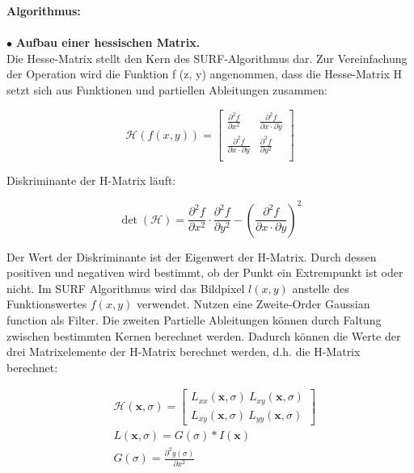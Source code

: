 \textbf{Algorithmus:}\\
\\
$\bullet$ \textbf{Aufbau einer hessischen Matrix.}\\
Die Hesse-Matrix stellt den Kern des SURF-Algorithmus dar. Zur Vereinfachung der Operation wird die Funktion f (z, y) angenommen, dass die Hesse-Matrix H setzt sich aus Funktionen und partiellen Ableitungen zusammen:

\begin{equation}
   \mathcal{H}(f(x,y)) = \begin{bmatrix}
   \frac{\partial^{2}f}{\partial x^{2}} & \frac{\partial^{2}f}{\partial x \cdot \partial y} \\
   \frac{\partial^{2}f}{\partial x \cdot \partial y} & \frac{\partial^{2}f}{\partial y^{2}} \\   
   \end{bmatrix}
\end{equation}

 Diskriminante der H-Matrix läuft:
 
\begin{equation}
   \det(\mathcal{H}) = \frac{\partial^{2}f}{\partial x^{2}} \cdot \frac{\partial^{2}f}{\partial y^{2}} - (\frac{\partial^{2}f}{\partial x \cdot \partial y})^2  
\end{equation}

Der Wert der Diskriminante ist der Eigenwert der H-Matrix. Durch dessen positiven und negativen wird bestimmt, ob der Punkt ein Extrempunkt ist oder nicht. Im SURF Algorithmus wird das Bildpixel $l(x,y)$ anstelle des Funktionswertes $f(x,y)$ verwendet. Nutzen eine Zweite-Order Gaussian function als Filter. Die zweiten Partielle Ableitungen können durch Faltung zwischen bestimmten Kernen berechnet werden. Dadurch können die Werte der drei Matrixelemente der H-Matrix berechnet werden, d.h. die H-Matrix berechnet:

\begin{equation}
\begin{split}
   &\mathcal{H}(\textbf{x},\sigma) = \begin{bmatrix}
   L_{xx}(\textbf{x},\sigma)\ L_{xy}(\textbf{x},\sigma) \\
   L_{xy}(\textbf{x},\sigma)\ L_{yy}(\textbf{x},\sigma)
   \end{bmatrix} \\   
   &L(\textbf{x},\sigma) = G(\sigma)*I(\textbf{x}) \\  
   &G(\sigma) = \frac{\partial^{2}g(\sigma)}{\partial x^{2}}      
\end{split}
\end{equation}


